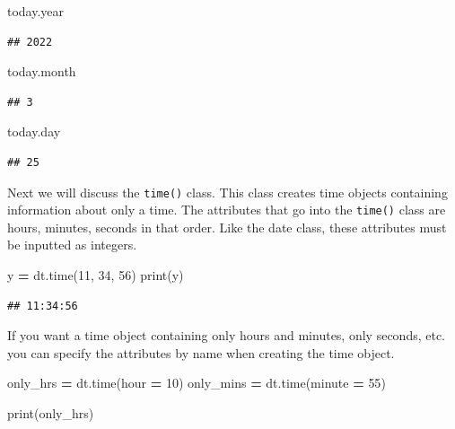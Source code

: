 \documentclass[
]{book}
\newenvironment{Shaded}{\begin{snugshade}}{\end{snugshade}}
\newcommand{\BuiltInTok}[1]{#1}
\newcommand{\DecValTok}[1]{\textcolor[rgb]{0.00,0.00,0.81}{#1}}
\newcommand{\NormalTok}[1]{#1}
\newcommand{\OperatorTok}[1]{\textcolor[rgb]{0.81,0.36,0.00}{\textbf{#1}}}
\begin{document}
\begin{Shaded}
\begin{Highlighting}[]
\NormalTok{today.year }
\end{Highlighting}
\end{Shaded}

\begin{verbatim}
## 2022
\end{verbatim}

\begin{Shaded}
\begin{Highlighting}[]
\NormalTok{today.month}
\end{Highlighting}
\end{Shaded}

\begin{verbatim}
## 3
\end{verbatim}

\begin{Shaded}
\begin{Highlighting}[]
\NormalTok{today.day}
\end{Highlighting}
\end{Shaded}

\begin{verbatim}
## 25
\end{verbatim}

Next we will discuss the \texttt{time()} class. This class creates time objects containing information about only a time. The attributes that go into the \texttt{time()} class are hours, minutes, seconds in that order. Like the date class, these attributes must be inputted as integers.

\begin{Shaded}
\begin{Highlighting}[]
\NormalTok{y }\OperatorTok{=}\NormalTok{ dt.time(}\DecValTok{11}\NormalTok{, }\DecValTok{34}\NormalTok{, }\DecValTok{56}\NormalTok{)}
\BuiltInTok{print}\NormalTok{(y)}
\end{Highlighting}
\end{Shaded}

\begin{verbatim}
## 11:34:56
\end{verbatim}

If you want a time object containing only hours and minutes, only seconds, etc. you can specify the attributes by name when creating the time object.

\begin{Shaded}
\begin{Highlighting}[]
\NormalTok{only\_hrs }\OperatorTok{=}\NormalTok{ dt.time(hour }\OperatorTok{=} \DecValTok{10}\NormalTok{)}
\NormalTok{only\_mins }\OperatorTok{=}\NormalTok{ dt.time(minute }\OperatorTok{=} \DecValTok{55}\NormalTok{)}

\BuiltInTok{print}\NormalTok{(only\_hrs)}
\end{Highlighting}
\end{Shaded}
\end{document}
